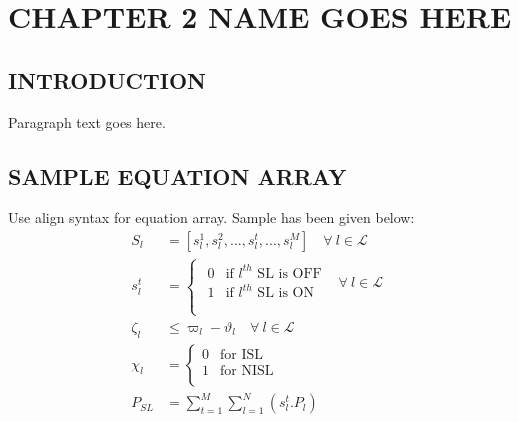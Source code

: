 \chapter{CHAPTER 2 NAME GOES HERE}
\section{INTRODUCTION}
Paragraph text goes here.

\section{SAMPLE EQUATION ARRAY}
Use align syntax for equation array. Sample has been given below:
\begin{align}
S_{l} &= [s_{l}^{1},s_{l}^{2},...,s_{l}^{t},...,s_{l}^{M}] \quad \forall \ l \in \mathcal{L} 
\label{SLstatus}
\\
s_{l}^{t} &= \left\{ \begin{array}{ll} \begin{array}{ll}
					0 & \mbox{if $l^{th}$ SL is OFF}  \\ 
         			1 & \mbox{if $l^{th}$ SL is ON} \\ \end{array} 
         			& \forall \ l \in \mathcal{L} \\ \end{array} \right. 
\label{SLelem}
\\
\zeta_{l} &\leq \varpi_{l}-\vartheta_{l} \quad \forall \ l \in \mathcal{L}
\label{InputConstraint}
\\
\chi_l &= \left \{ \begin{array}{ll}
			0 & \mbox{for ISL} \\
			1 & \mbox{for NISL} \\
			\end{array} \right.
\label{SLPremption}
\\
P_{SL} &= \sum_{t=1}^{M}{\sum_{l=1}^{N}(s_{l}^{t}.P_{l})}
\label{SLpower}
\end{align}

